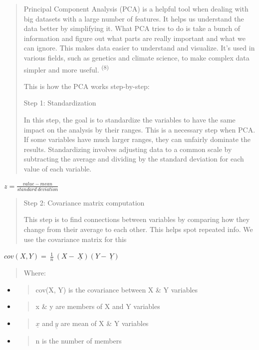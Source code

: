 \documentclass[
]{article}
\begin{document}
\begin{quote}
Principal Component Analysis (PCA) is a helpful tool when dealing with
big datasets with a large number of features. It helps us understand the
data better by simplifying it. What PCA tries to do is take a bunch of
information and figure out what parts are really important and what we
can ignore. This makes data easier to understand and visualize. It's
used in various fields, such as genetics and climate science, to make
complex data simpler and more useful. \textsuperscript{(8)}

This is how the PCA works step-by-step:

Step 1: Standardization

In this step, the goal is to standardize the variables to have the same
impact on the analysis by their ranges. This is a necessary step when
PCA. If some variables have much larger ranges, they can unfairly
dominate the results. Standardizing involves adjusting data to a common
scale by subtracting the average and dividing by the standard deviation
for each value of each variable.
\end{quote}

\(z = \frac{value - mean}{standard\ deviation}\)

\begin{quote}
Step 2: Covariance matrix computation

This step is to find connections between variables by comparing how they
change from their average to each other. This helps spot repeated info.
We use the covariance matrix for this
\end{quote}

\(cov(X,Y) = \ \frac{1}{n}\ \left( X - \ \underline{X} \right)\left( Y - \ \underline{Y} \right)\)

\begin{quote}
Where:
\end{quote}

\begin{itemize}
\item
  \begin{quote}
  cov(X, Y) is the covariance between X \& Y variables
  \end{quote}
\item
  \begin{quote}
  x \& y are members of X and Y variables
  \end{quote}
\item
  \begin{quote}
  \(\underline{x}\) and\(\ \underline{y}\) are mean of X \& Y variables
  \end{quote}
\item
  \begin{quote}
  n is the number of members
  \end{quote}
\end{itemize}
\end{document}
